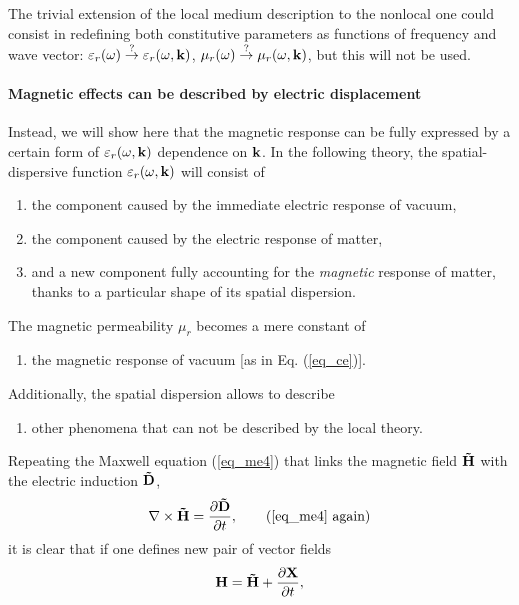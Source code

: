 The trivial extension of the local medium description to the nonlocal one could consist in redefining both constitutive parameters as functions of frequency and wave vector: $\varepsilon_r(\omega) \stackrel{?}{\rightarrow} \varepsilon_r(\omega, {\mathbf{k}})$, $\mu_r(\omega) \stackrel{?}{\rightarrow} \mu_r(\omega, {\mathbf{k}})$, but this will not be used. 

\paragraph{Magnetic effects can be described by electric displacement}%
Instead, we will show here that the magnetic response can be fully expressed by a certain form of $\varepsilon_r(\omega, {\mathbf{k}})$ dependence on ${\mathbf{k}}$. In the following theory, the spatial-dispersive function $\varepsilon_r(\omega, {\mathbf{k}})$ will consist of
\begin{enumerate}
 \item{the component caused by the immediate electric response of vacuum,} 
 \item{the component caused by the electric response of matter,}
 \item{and a new component fully accounting for the \textit{magnetic} response of matter, thanks to a particular shape of its spatial dispersion.}
\end{enumerate}
The magnetic permeability $\mu_r$ becomes a mere constant of
\begin{enumerate}[resume]
 \item{the magnetic response of vacuum [as in Eq. (\ref{eq_ce})].} 
\end{enumerate}
Additionally, the spatial dispersion allows to describe
\begin{enumerate}[resume]
 \item{other phenomena that can not be described by the local theory.} 
\end{enumerate}
Repeating the Maxwell equation (\ref{eq_me4}) that links the magnetic field $\mathbf{\tilde{H}}$ with the electric induction $\mathbf{\tilde{D}}$, 
\begin{equation} \nabla \times \HH =  \frac{\partial \D} {\partial t}, \tag{\ref{eq_me4} \again} \end{equation}
it is clear that if one defines new pair of vector fields
\begin{equation} \mathbf{H} = \mathbf{\tilde{H}} + \frac{\partial\mathbf{X}}{\partial t}, \label{eq_HHsd}\end{equation}
